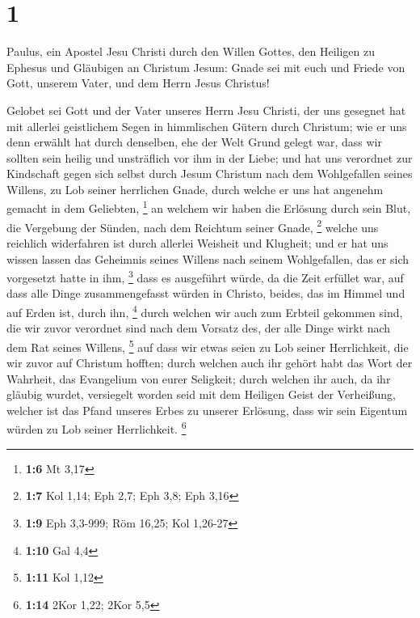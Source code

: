 \hypertarget{section}{%
\section{1}\label{section}}

 Paulus, ein Apostel Jesu Christi durch den Willen Gottes,
den Heiligen zu Ephesus und Gläubigen an Christum Jesum: 
Gnade sei mit euch und Friede von Gott, unserem Vater, und dem Herrn
Jesus Christus!

 Gelobet sei Gott und der Vater unseres Herrn Jesu Christi,
der uns gesegnet hat mit allerlei geistlichem Segen in himmlischen
Gütern durch Christum;  wie er uns denn erwählt hat durch
denselben, ehe der Welt Grund gelegt war, dass wir sollten sein heilig
und unsträflich vor ihm in der Liebe;  und hat uns verordnet
zur Kindschaft gegen sich selbst durch Jesum Christum nach dem
Wohlgefallen seines Willens,  zu Lob seiner herrlichen
Gnade, durch welche er uns hat angenehm gemacht in dem Geliebten,
\footnote{\textbf{1:6} Mt 3,17}  an welchem wir haben die
Erlösung durch sein Blut, die Vergebung der Sünden, nach dem Reichtum
seiner Gnade, \footnote{\textbf{1:7} Kol 1,14; Eph 2,7; Eph 3,8; Eph
  3,16}  welche uns reichlich widerfahren ist durch allerlei
Weisheit und Klugheit;  und er hat uns wissen lassen das
Geheimnis seines Willens nach seinem Wohlgefallen, das er sich
vorgesetzt hatte in ihm, \footnote{\textbf{1:9} Eph 3,3-999; Röm 16,25;
  Kol 1,26-27}  dass es ausgeführt würde, da die Zeit
erfüllet war, auf dass alle Dinge zusammengefasst würden in Christo,
beides, das im Himmel und auf Erden ist, durch ihn, \footnote{\textbf{1:10}
  Gal 4,4}  durch welchen wir auch zum Erbteil gekommen
sind, die wir zuvor verordnet sind nach dem Vorsatz des, der alle Dinge
wirkt nach dem Rat seines Willens, \footnote{\textbf{1:11} Kol 1,12}
 auf dass wir etwas seien zu Lob seiner Herrlichkeit, die
wir zuvor auf Christum hofften;  durch welchen auch ihr
gehört habt das Wort der Wahrheit, das Evangelium von eurer Seligkeit;
durch welchen ihr auch, da ihr gläubig wurdet, versiegelt worden seid
mit dem Heiligen Geist der Verheißung,  welcher ist das
Pfand unseres Erbes zu unserer Erlösung, dass wir sein Eigentum würden
zu Lob seiner Herrlichkeit. \footnote{\textbf{1:14} 2Kor 1,22; 2Kor 5,5}

